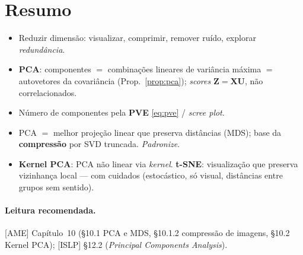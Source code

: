 \documentclass[11pt,a4paper]{article}
\begin{document}
\section*{Resumo}
\begin{itemize}[leftmargin=1.4cm]
  \item Reduzir dimensão: visualizar, comprimir, remover ruído, explorar
        \emph{redundância}.
  \item \textbf{PCA}: componentes $=$ combinações lineares de variância máxima
        $=$ autovetores da covariância (Prop.~\ref{prop:pca}); \emph{scores}
        $\bm{Z}=\bm{X}\bm{U}$, não correlacionados.
  \item Número de componentes pela \textbf{PVE} \eqref{eq:pve} / \emph{scree plot}.
  \item PCA $=$ melhor projeção linear que preserva distâncias (MDS); base da
        \textbf{compressão} por SVD truncada. \emph{Padronize}.
  \item \textbf{Kernel PCA}: PCA não linear via \emph{kernel}. \textbf{t-SNE}:
        visualização que preserva vizinhança local --- com cuidados (estocástico,
        só visual, distâncias entre grupos sem sentido).
\end{itemize}

\paragraph{Leitura recomendada.} [AME] Capítulo~10 (§10.1 PCA e MDS, §10.1.2
compressão de imagens, §10.2 Kernel PCA); [ISLP] §12.2 (\emph{Principal Components
Analysis}).
\end{document}
